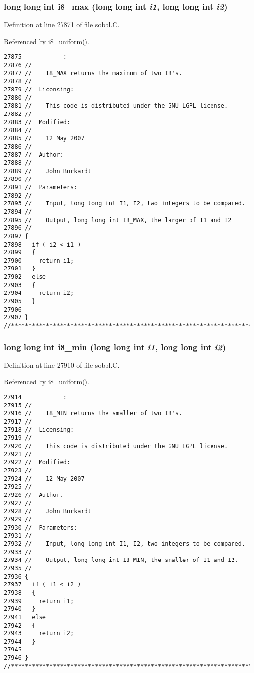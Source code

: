 \subsubsection{\setlength{\rightskip}{0pt plus 5cm}long long int i8\_\-max (long long int {\em i1}, long long int {\em i2})}\label{sobol_8C_b74fd7151bdaca24b5e38cacad5b250a}




Definition at line 27871 of file sobol.C.

Referenced by i8\_\-uniform().

\begin{Code}\begin{verbatim}27875            :
27876 //
27877 //    I8_MAX returns the maximum of two I8's.
27878 //
27879 //  Licensing:
27880 //
27881 //    This code is distributed under the GNU LGPL license. 
27882 //
27883 //  Modified:
27884 //
27885 //    12 May 2007
27886 //
27887 //  Author:
27888 //
27889 //    John Burkardt
27890 //
27891 //  Parameters:
27892 //
27893 //    Input, long long int I1, I2, two integers to be compared.
27894 //
27895 //    Output, long long int I8_MAX, the larger of I1 and I2.
27896 //
27897 {
27898   if ( i2 < i1 ) 
27899   {
27900     return i1;
27901   }
27902   else 
27903   {
27904     return i2;
27905   }
27906 
27907 }
//****************************************************************************80
\end{verbatim}
\end{Code}


\subsubsection{\setlength{\rightskip}{0pt plus 5cm}long long int i8\_\-min (long long int {\em i1}, long long int {\em i2})}\label{sobol_8C_b36e8d4b0bc7da5afae73987d8649e06}




Definition at line 27910 of file sobol.C.

Referenced by i8\_\-uniform().

\begin{Code}\begin{verbatim}27914            :
27915 //
27916 //    I8_MIN returns the smaller of two I8's.
27917 //
27918 //  Licensing:
27919 //
27920 //    This code is distributed under the GNU LGPL license. 
27921 //
27922 //  Modified:
27923 //
27924 //    12 May 2007
27925 //
27926 //  Author:
27927 //
27928 //    John Burkardt
27929 //
27930 //  Parameters:
27931 //
27932 //    Input, long long int I1, I2, two integers to be compared.
27933 //
27934 //    Output, long long int I8_MIN, the smaller of I1 and I2.
27935 //
27936 {
27937   if ( i1 < i2 ) 
27938   {
27939     return i1;
27940   }
27941   else 
27942   {
27943     return i2;
27944   }
27945 
27946 }
//****************************************************************************80
\end{verbatim}
\end{Code}


